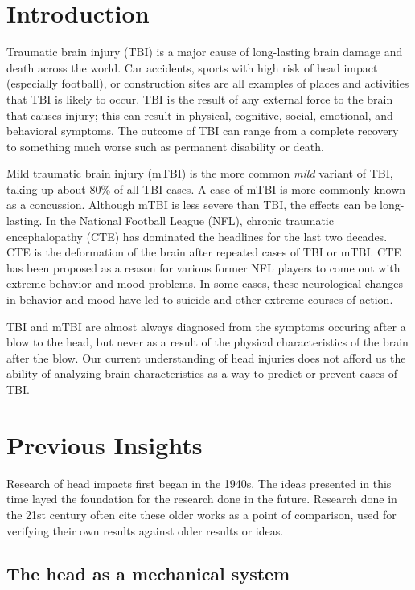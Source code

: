 \documentclass[%
 aip,
 amsmath,amssymb,
 reprint,%
 floatfix,%
]{revtex4-1}
\begin{document}
\section{\label{sec:level1}Introduction}

Traumatic brain injury (TBI) is a major cause of long-lasting brain damage and death across the world. Car accidents, sports with high risk of head impact (especially football), or construction sites are all examples of places and activities that TBI is likely to occur. TBI is the result of any external force to the brain that causes injury; this can result in physical, cognitive, social, emotional, and behavioral symptoms. The outcome of TBI can range from a complete recovery to something much worse such as permanent disability or death.

Mild traumatic brain injury (mTBI) is the more common {\it mild} variant of TBI, taking up about 80\% of all TBI cases. A case of mTBI is more commonly known as a concussion. Although mTBI is less severe than TBI, the effects can be long-lasting. In the National Football League (NFL), chronic traumatic encephalopathy (CTE) has dominated the headlines for the last two decades. CTE is the deformation of the brain after repeated cases of TBI or mTBI. CTE has been proposed as a reason for various former NFL players to come out with extreme behavior and mood problems. In some cases, these neurological changes in behavior and mood have led to suicide and other extreme courses of action. 

TBI and mTBI are almost always diagnosed from the symptoms occuring after a blow to the head, but never as a result of the physical characteristics of the brain after the blow. Our current understanding of head injuries does not afford us the ability of analyzing brain characteristics as a way to predict or prevent cases of TBI. 

\section{\label{sec:level2}Previous Insights}

Research of head impacts first began in the 1940s. The ideas presented in this time layed the foundation for the research done in the future. Research done in the 21st century often cite these older works as a point of comparison, used for verifying their own results against older results or ideas.

\subsection{The head as a mechanical system}
\end{document}
